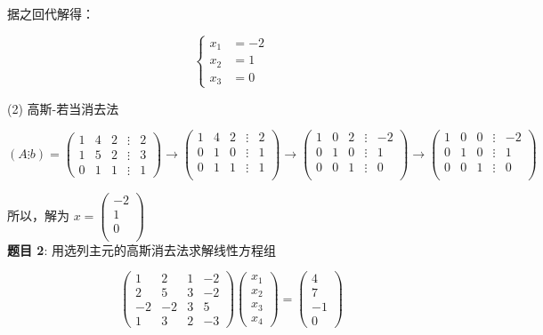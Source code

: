\documentclass{article}
\begin{document}
据之回代解得：

$$
\left\{
\begin{aligned}
    x_1 &= -2 \\
    x_2 &= 1 \\
    x_3 &= 0
\end{aligned}
\right.
$$

\noindent (2) 高斯-若当消去法

$$
(A\vdots b)
=
\begin{pmatrix}
    1 & 4 & 2 & \vdots & 2 \\
    1 & 5 & 2 & \vdots & 3 \\
    0 & 1 & 1 & \vdots & 1
\end{pmatrix}
\longrightarrow
\begin{pmatrix}
    1 & 4 & 2 & \vdots & 2 \\
    0 & 1 & 0 & \vdots & 1 \\
    0 & 1 & 1 & \vdots & 1 \\
\end{pmatrix}
\longrightarrow
\begin{pmatrix}
    1 & 0 & 2 & \vdots & -2 \\
    0 & 1 & 0 & \vdots & 1 \\
    0 & 0 & 1 & \vdots & 0 \\
\end{pmatrix}
\longrightarrow
\begin{pmatrix}
    1 & 0 & 0 & \vdots & -2 \\
    0 & 1 & 0 & \vdots & 1 \\
    0 & 0 & 1 & \vdots & 0 \\
\end{pmatrix}
$$

所以，解为 
$
x=
\begin{pmatrix}
    -2 \\
    1 \\
    0 \\
\end{pmatrix}
$ \\

\noindent\textbf{题目 2}: 用选列主元的高斯消去法求解线性方程组

$$
\begin{pmatrix}
    1 & 2 & 1 & -2 \\
    2 & 5 & 3 & -2 \\
    -2 & -2 & 3 & 5 \\
    1 & 3 & 2 & -3
\end{pmatrix}
\begin{pmatrix}
    x_1 \\
    x_2 \\
    x_3 \\
    x_4
\end{pmatrix}
=
\begin{pmatrix}
    4 \\
    7 \\
    -1 \\
    0
\end{pmatrix}
$$
\end{document}
